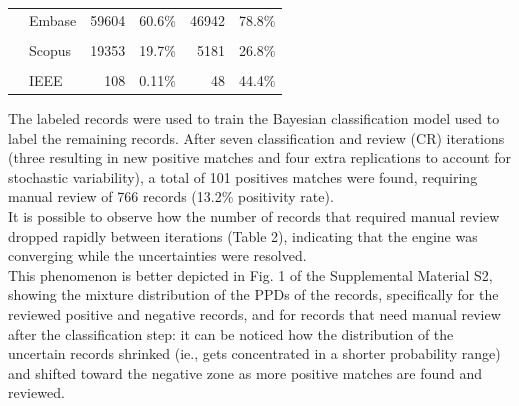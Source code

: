 \documentclass{article}
\begin{document}
\begin{table}[!h]
{\begin{tabular}[t]{llrlrl}
 & Embase & 59604 & 60.6\% & 46942 & 78.8\%\\
\cellcolor{gray!6}{} & \cellcolor{gray!6}{Pubmed} & \cellcolor{gray!6}{37278} & \cellcolor{gray!6}{37.9\%} & \cellcolor{gray!6}{21371} & \cellcolor{gray!6}{57.3\%}\\
\addlinespace
 & Scopus & 19353 & 19.7\% & 5181 & 26.8\%\\
\cellcolor{gray!6}{} & \cellcolor{gray!6}{WOS} & \cellcolor{gray!6}{14367} & \cellcolor{gray!6}{14.6\%} & \cellcolor{gray!6}{3175} & \cellcolor{gray!6}{22.1\%}\\
 & IEEE & 108 & 0.11\% & 48 & 44.4\%\\
\bottomrule
\end{tabular}}
\end{table}

The labeled records were used to train the Bayesian classification model
used to label the remaining records. After seven classification and
review (CR) iterations (three resulting in new positive matches and four
extra replications to account for stochastic variability), a total of
101 positives matches were found, requiring manual review of 766 records
(13.2\% positivity rate).\\
It is possible to observe how the number of records that required manual
review dropped rapidly between iterations (Table 2), indicating that the
engine was converging while the uncertainties were resolved.\\
This phenomenon is better depicted in Fig. 1 of the Supplemental
Material S2, showing the mixture distribution of the PPDs of the
records, specifically for the reviewed positive and negative records,
and for records that need manual review after the classification step:
it can be noticed how the distribution of the uncertain records shrinked
(ie., gets concentrated in a shorter probability range) and shifted
toward the negative zone as more positive matches are found and
reviewed.
\end{document}
